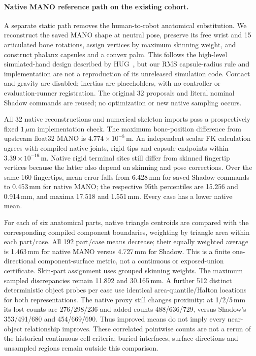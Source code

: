 \paragraph{Native MANO reference path on the existing cohort.}
A separate static path removes the human-to-robot anatomical substitution.
We reconstruct the saved MANO shape at neutral pose, preserve its free wrist
and 15 articulated bone rotations, assign vertices by maximum skinning
weight, and construct phalanx capsules and a convex palm. This follows the
high-level simulated-hand design described by HUG~\cite{hug}, but our RMS
capsule-radius rule and implementation are not a reproduction of its
unreleased simulation code. Contact and gravity are disabled; inertias are
placeholders, with no controller or evaluation-runner registration.
The original 32 proposals and literal nominal Shadow commands are reused;
no optimization or new native sampling occurs.

All 32 native reconstructions and numerical skeleton imports pass a
prospectively fixed $1\,\mu$m implementation check. The maximum bone-position
difference from upstream float32 MANO is $4.774\times10^{-8}$\,m. An independent
scalar FK calculation agrees with compiled native joints, rigid tips and
capsule endpoints within $3.39\times10^{-16}$\,m. Native rigid terminal sites
still differ from skinned fingertip vertices because the latter also depend
on skinning and pose corrections. Over the same 160 fingertips, mean error
falls from 6.428\,mm for saved Shadow commands to 0.453\,mm for native MANO;
the respective 95th percentiles are 15.256 and 0.914\,mm, and maxima 17.518
and 1.551\,mm. Every case has a lower native mean.

For each of six anatomical parts, native triangle centroids are compared
with the corresponding compiled component boundaries, weighting by triangle
area within each part/case. All 192 part/case means decrease; their equally
weighted average is 1.463\,mm for native MANO versus 4.727\,mm for Shadow.
This is a finite one-directional component-surface metric, not a continuous
or exposed-union certificate. Skin-part assignment uses grouped skinning
weights. The maximum sampled discrepancies remain 11.892 and 30.165\,mm.
A further 512 distinct deterministic object probes per case use identical
area-quantile/Halton locations for both representations. The native proxy
still changes proximity: at 1/2/5\,mm its lost counts are 276/298/236 and
added counts 488/636/729, versus Shadow's 353/491/680 and 454/669/690.
Thus improved means do not imply every near-object relationship improves.
These correlated pointwise counts are not a rerun of the historical
continuous-cell criteria; buried interfaces, surface directions and unsampled
regions remain outside this comparison.

